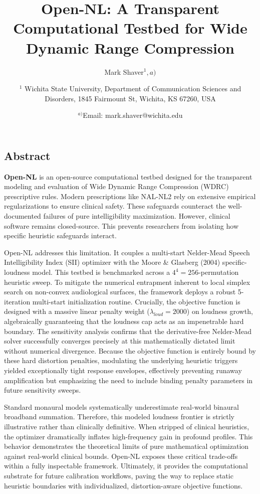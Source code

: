 \documentclass[
  12pt,
]{article}
\title{Open-NL: A Transparent Computational Testbed for Wide Dynamic
Range Compression}
\author{Mark
Shaver\(^1,a)\) \and \parbox{\textwidth}{\centering $^1$ Wichita State University, Department of Communication Sciences and Disorders, 1845 Fairmount St, Wichita, KS 67260, USA} \and \(^{a)}\)Email:
mark.shaver@wichita.edu}
\date{}
\begin{document}
\maketitle

\linenumbers

\subsection{Abstract}\label{abstract}

\textbf{Open-NL} is an open-source computational testbed designed for
the transparent modeling and evaluation of Wide Dynamic Range
Compression (WDRC) prescriptive rules. Modern prescriptions like NAL-NL2
rely on extensive empirical regularizations to ensure clinical safety.
These safeguards counteract the well-documented failures of pure
intelligibility maximization. However, clinical software remains
closed-source. This prevents researchers from isolating how specific
heuristic safeguards interact.

Open-NL addresses this limitation. It couples a multi-start Nelder-Mead
Speech Intelligibility Index (SII) optimizer with the Moore \& Glasberg
(2004) specific-loudness model. This testbed is benchmarked across a
\(4^4 = 256\)-permutation heuristic sweep. To mitigate the numerical
entrapment inherent to local simplex search on non-convex audiological
surfaces, the framework deploys a robust 5-iteration multi-start
initialization routine. Crucially, the objective function is designed
with a massive linear penalty weight (\(\lambda_{loud} = 2000\)) on
loudness growth, algebraically guaranteeing that the loudness cap acts
as an impenetrable hard boundary. The sensitivity analysis confirms that
the derivative-free Nelder-Mead solver successfully converges precisely
at this mathematically dictated limit without numerical divergence.
Because the objective function is entirely bound by these hard
distortion penalties, modulating the underlying heuristic triggers
yielded exceptionally tight response envelopes, effectively preventing
runaway amplification but emphasizing the need to include binding
penalty parameters in future sensitivity sweeps.

Standard monaural models systematically underestimate real-world
binaural broadband summation. Therefore, this modeled loudness frontier
is strictly illustrative rather than clinically definitive. When
stripped of clinical heuristics, the optimizer dramatically inflates
high-frequency gain in profound profiles. This behavior demonstrates the
theoretical limits of pure mathematical optimization against real-world
clinical bounds. Open-NL exposes these critical trade-offs within a
fully inspectable framework. Ultimately, it provides the computational
substrate for future calibration workflows, paving the way to replace
static heuristic boundaries with individualized, distortion-aware
objective functions.
\end{document}
